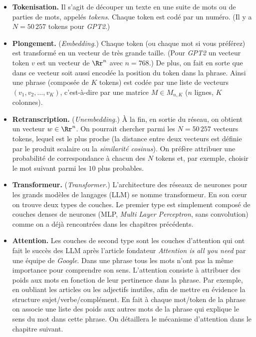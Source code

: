 \documentclass[11pt,class=report,crop=false]{standalone}
\begin{document}
\begin{itemize}
	\item \textbf{Tokenisation.} 
	Il s'agit de découper un texte en une suite de mots ou de parties de mots, appelés \emph{tokens}. Chaque token est codé par un numéro. (Il y a $N=50\,257$ tokens pour \emph{GPT2}.)
	
	\item \textbf{Plongement.} (\emph{Embedding.})
	Chaque token (ou chaque mot si vous préférez) est transformé en un vecteur de très grande taille. (Pour \emph{GPT2} un vecteur token $v$ est un vecteur de  $\Rr^n$ avec $n=768$.) De plus, on fait en sorte que dans ce vecteur soit aussi encodée la position du token dans la phrase.
	Ainsi une phrase (composée de $K$ tokens) est codée par une liste de vecteurs $(v_1,v_2,\ldots,v_K)$,	c'est-à-dire par une matrice $M \in M_{n,K}$ ($n$ lignes, $K$ colonnes).
	
	\item \textbf{Retranscription.} (\emph{Unembedding.})
	À la fin, en sortie du réseau, on obtient un vecteur $w \in \Rr^n$. On pourrait chercher parmi les $N= 50\,257$ vecteurs tokens, lequel est le plus proche (la distance entre deux vecteurs est définie par le produit scalaire ou la \emph{similarité cosinus}). On préfère attribuer une probabilité de correspondance à chacun des $N$ tokens et, par exemple, choisir le mot suivant parmi les $10$ plus probables.
	
	\item \textbf{Transformeur.} (\emph{Transformer.}) L'architecture des réseaux de neurones pour les grands modèles de langages (LLM) se nomme transformeur. En son c\oe ur on trouve deux types de couches. Le premier type est simplement composé de couches denses de neurones (MLP, \emph{Multi Layer Perceptron}, sans convolution) comme on a déjà rencontrées dans les chapitres précédents. 
	
	\item \textbf{Attention.} 
	Les couches de second type sont les couches d'attention qui ont fait le succès des LLM après l'article fondateur \emph{Attention is all you need} par une équipe de \emph{Google}. 
	Dans une phrase tous les mots n'ont pas la même importance pour comprendre son sens. L'attention consiste à attribuer des poids aux mots en fonction de leur pertinence dans la phrase. Par exemple, en oubliant les articles ou les adjectifs inutiles, afin de mettre en évidence la structure sujet/verbe/complément.
	En fait à chaque mot/token de la phrase on associe une liste des poids aux autres mots de la phrase qui explique le sens du mot dans cette phrase. 	
	On détaillera le mécanisme d'attention dans le chapitre suivant.
	

\end{itemize}
\end{document}
